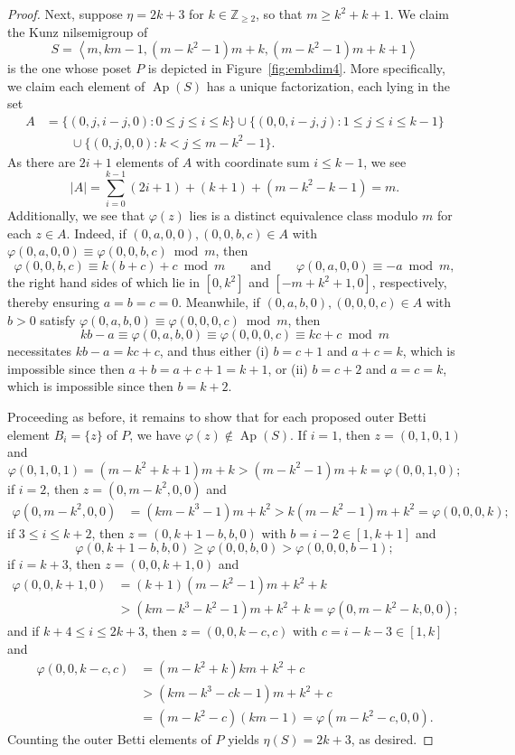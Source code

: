 \documentclass[ALCO]{cedram}
\newcommand\ZZ{\mathbb{Z}}
\DeclareMathOperator\Ap{Ap}
\begin{document}
\begin{proof}
Next, suppose $\eta = 2k+3$ for $k \in \ZZ_{\ge 2}$, so that $m \ge k^2+k+1$.  We claim the Kunz nilsemigroup of $$S = \left\langle m, km - 1,   (m - k^2-1)m +  k, (m - k^2 -1)m +  k+1\right\rangle$$ is the one whose poset $P$ is depicted in Figure~\ref{fig:embdim4}. More specifically, we claim each element of $\Ap(S)$ has a unique factorization, each lying in the set 
\begin{align*}
A &= \{(0, j, i-j, 0) : 0 \le j \le i \le k\}
\cup \{(0, 0, i-j, j): 1 \le j \le i \le k-1\} \\
& \qquad \cup \{(0, j, 0, 0) : k < j \le m - k^2 -1\}.
\end{align*}
As there are $2i+1$ elements of $A$ with coordinate sum $i \leq k-1$, we see
$$|A| = \sum_{i=0}^{k-1} (2i+1) + (k + 1) + (m-k^2-k - 1) = m.$$ Additionally, we see that $\varphi(z)$ lies is a distinct equivalence class modulo $m$ for each $z \in A$. Indeed, if $(0,a,0,0), (0,0,b,c) \in A$ with $\varphi(0,a,0,0) \equiv \varphi(0,0,b,c) \bmod m$, then 
$$\varphi(0,0,b,c) \equiv k(b + c) + c \bmod m
\qquad \text{and} \qquad
\varphi(0,a,0,0) \equiv -a \bmod m,$$
the right hand sides of which lie in $[0, k^2]$ and $[-m + k^2 + 1, 0]$, respectively, thereby ensuring $a = b = c = 0$. Meanwhile, if $(0,a,b,0), (0,0,0,c) \in A$ with $b > 0$ satisfy $\varphi(0,a,b,0) \equiv \varphi(0,0,0,c) \bmod m$, then 
$$kb - a \equiv \varphi(0,a,b,0) \equiv \varphi(0,0,0,c) \equiv kc + c \bmod m$$
necessitates $kb - a = kc + c$, and thus either (i) $b = c + 1$ and $a + c = k$, which is impossible since then $a + b = a + c + 1 = k + 1$, or (ii) $b = c + 2$ and $a = c = k$, which is impossible since then $b = k + 2$.  

Proceeding as before, it remains to show that for each proposed outer Betti element $B_i = \{z\}$ of $P$, we have $\varphi(z) \notin \Ap(S)$.  
If $i = 1$, then $z = (0,1,0,1)$ and
$$\varphi(0,1,0,1) = (m - k^2 + k + 1)m + k > (m - k^2-1)m +  k = \varphi(0,0,1,0);$$
if $i = 2$, then $z = (0,m - k^2,0,0)$ and 
\begin{align*}
    \varphi(0, m - k^2, 0, 0) 
    &= (km - k^3 - 1)m + k^2 
    > k(m-k^2-1)m +  k^2 = \varphi(0, 0, 0, k);
\end{align*}
if $3 \le i \le k + 2$, then $z = (0, k+1-b, b, 0)$ with $b = i - 2 \in [1, k+1]$ and 
$$\varphi(0, k + 1 - b, b, 0) \ge \varphi(0, 0, b, 0) > \varphi(0, 0, 0, b - 1);$$
if $i = k+3$, then $z = (0,0,k+1,0)$ and 
\begin{align*}
    \varphi(0,0, k+1,0) &= (k+1)(m - k^2 - 1)m + k^2 + k\\
    &> (km - k^3 - k^2 - 1)m + k^2 + k = \varphi(0,m-k^2-k,0,0);
\end{align*}
and if $k+4 \le i \le 2k+3$, then $z = (0,0,k-c,c)$ with $c = i - k - 3 \in [1,k]$ and 
\begin{align*}
    \varphi(0,0,k-c,c) &= (m-k^2+k)km + k^2 + c\\
    &> (km - k^3 - ck - 1)m + k^2 + c\\
    &= (m - k^2 - c)(km - 1) = \varphi(m - k^2 - c,0,0).
\end{align*}
Counting the outer Betti elements of $P$ yields $\eta(S) = 2k + 3$, as desired.
\end{proof}
\end{document}
